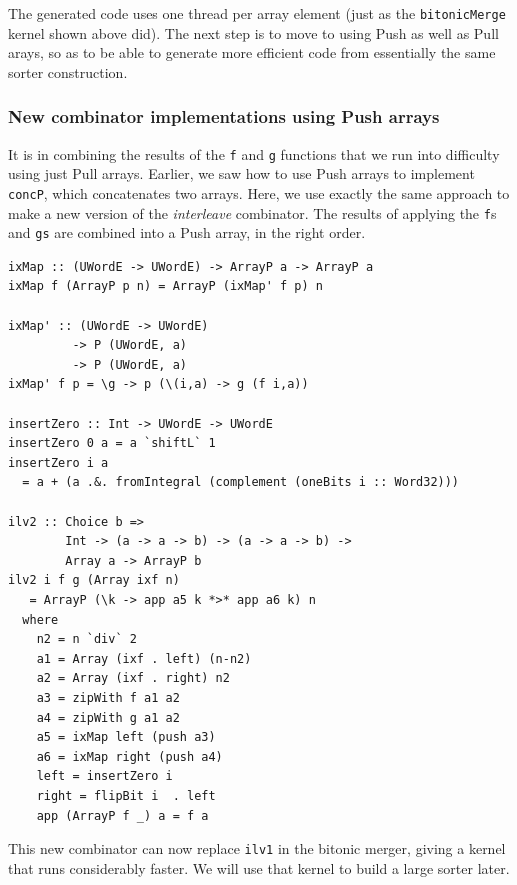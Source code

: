The generated code
uses
one thread per array element (just as the {\tt bitonicMerge}
kernel shown above did). The next step is to move to using Push as
well as Pull arays, so as to be able to generate more efficient code
from essentially the same sorter construction.

\subsubsection{New combinator implementations using Push arrays}


It is in combining the results of the {\tt f} and {\tt g} functions
that we run into difficulty using just Pull arrays.
Earlier, we saw how to use Push arrays to implement {\tt concP},
which concatenates two arrays.
Here, we use exactly the same approach to make a new version of
the {\em interleave} combinator. The results of applying
the {\tt f}s and {\tt gs} are combined into a Push array, in the right
order.
\pagebreak
\begin{codesize}
\begin{verbatim}
ixMap :: (UWordE -> UWordE) -> ArrayP a -> ArrayP a 
ixMap f (ArrayP p n) = ArrayP (ixMap' f p) n

ixMap' :: (UWordE -> UWordE) 
         -> P (UWordE, a)
         -> P (UWordE, a) 
ixMap' f p = \g -> p (\(i,a) -> g (f i,a))

insertZero :: Int -> UWordE -> UWordE
insertZero 0 a = a `shiftL` 1
insertZero i a 
  = a + (a .&. fromIntegral (complement (oneBits i :: Word32)))

ilv2 :: Choice b => 
        Int -> (a -> a -> b) -> (a -> a -> b) -> 
        Array a -> ArrayP b
ilv2 i f g (Array ixf n) 
   = ArrayP (\k -> app a5 k *>* app a6 k) n
  where
    n2 = n `div` 2
    a1 = Array (ixf . left) (n-n2)
    a2 = Array (ixf . right) n2
    a3 = zipWith f a1 a2
    a4 = zipWith g a1 a2
    a5 = ixMap left (push a3)
    a6 = ixMap right (push a4)
    left = insertZero i
    right = flipBit i  . left
    app (ArrayP f _) a = f a
\end{verbatim}
\end{codesize}
\noindent
This new combinator can now replace {\tt ilv1} in the bitonic
merger, giving a kernel that runs considerably faster. We will use
that kernel to build a large sorter later.

